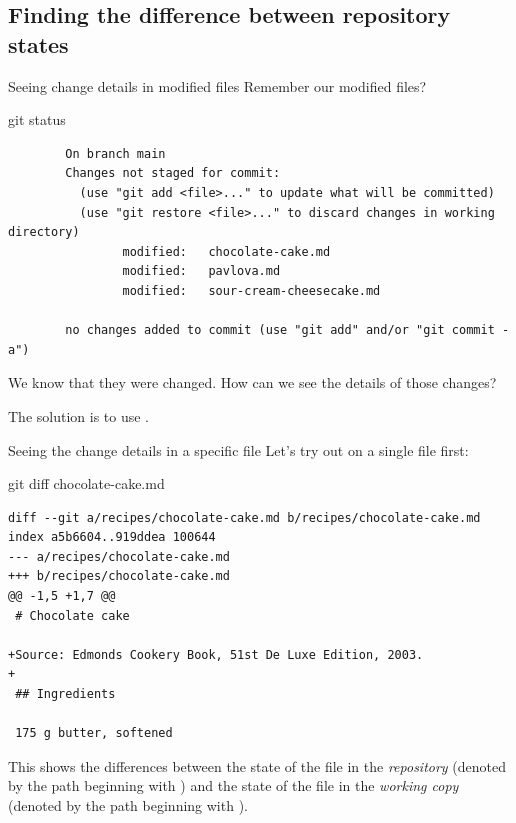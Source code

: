 \documentclass{git_course}
\begin{document}
\subsection{Finding the difference between repository states}

\begin{frame}[fragile]{Seeing change details in modified files}
    Remember our modified files?
    \begin{shellcode}
        git status
    \end{shellcode}
    \begin{verbatim}
        On branch main
        Changes not staged for commit:
          (use "git add <file>..." to update what will be committed)
          (use "git restore <file>..." to discard changes in working directory)
                modified:   chocolate-cake.md
                modified:   pavlova.md
                modified:   sour-cream-cheesecake.md

        no changes added to commit (use "git add" and/or "git commit -a")
    \end{verbatim}

    We know that they were changed.  How can we see the details of those
    changes?

    The solution is to use .
\end{frame}

\begin{frame}[fragile]{Seeing the change details in a specific file}
    Let's try  out on a single file first:
    \begin{shellcode}
        git diff chocolate-cake.md
    \end{shellcode}
    \begin{verbatim}
diff --git a/recipes/chocolate-cake.md b/recipes/chocolate-cake.md
index a5b6604..919ddea 100644
--- a/recipes/chocolate-cake.md
+++ b/recipes/chocolate-cake.md
@@ -1,5 +1,7 @@
 # Chocolate cake

+Source: Edmonds Cookery Book, 51st De Luxe Edition, 2003.
+
 ## Ingredients

 175 g butter, softened
    \end{verbatim}

    This shows the differences between the state of the file in the
    \emph{repository} (denoted by the path beginning with ) and the
    state of the file in the \emph{working copy} (denoted by the path
    beginning with ).
\end{frame}
\end{document}

